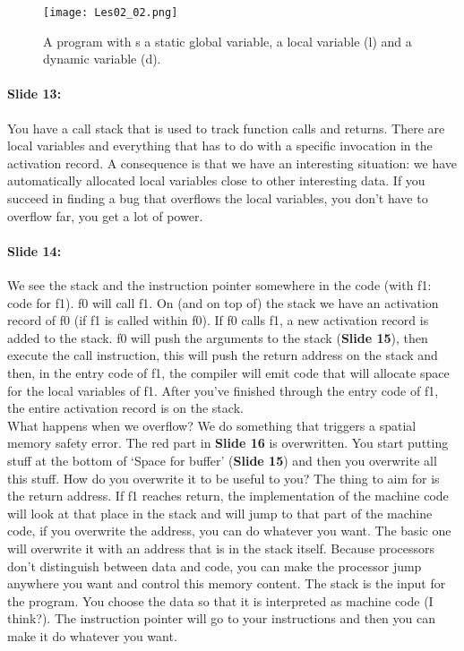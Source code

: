 \documentclass[10pt,a4paper]{report}
\begin{document}
\begin{figure}[ht!]
\centering
\texttt{[image: Les02\_02.png]}
\caption{A program with s a static global variable, a local variable (l) and a dynamic variable (d).} 
\label{les02_02}
\end{figure}

\paragraph{Slide 13:} You have a call stack that is used to track function calls and returns. There are local variables and everything that has to do with a specific invocation in the activation record. A consequence is that we have an interesting situation: we have automatically allocated local variables close to other interesting data. If you succeed in finding a bug that overflows the local variables, you don't have to overflow far, you get a lot of power.

\paragraph{Slide 14:} We see the stack and the instruction pointer somewhere in the code (with f1: code for f1). f0 will call f1. On (and on top of) the stack we have an activation record of f0 (if f1 is called within f0). If f0 calls f1, a new activation record is added to the stack. f0 will push the arguments to the stack (\textbf{Slide 15}), then execute the call instruction, this will push the return address on the stack and then, in the entry code of f1, the compiler will emit code that will allocate space for the local variables of f1. After you've finished through the entry code of f1, the entire activation record is on the stack. \\
What happens when we overflow? We do something that triggers a spatial memory safety error. The red part in \textbf{Slide 16} is overwritten. You start putting stuff at the bottom of `Space for buffer' (\textbf{Slide 15}) and then you overwrite all this stuff. How do you overwrite it to be useful to you? The thing to aim for is the return address. If f1 reaches return, the implementation of the machine code will look at that place in the stack and will jump to that part of the machine code, if you overwrite the address, you can do whatever you want. The basic one will overwrite it with an address that is in the stack itself. Because processors don't distinguish between data and code, you can make the processor jump anywhere you want and control this memory content. The stack is the input for the program. You choose the data so that it is interpreted as machine code (I think?). The instruction pointer will go to your instructions and then you can make it do whatever you want.
\end{document}
